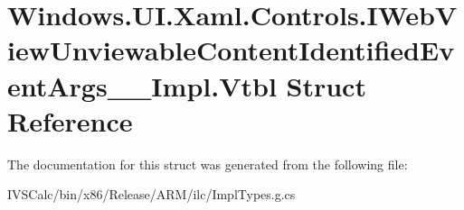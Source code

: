 \hypertarget{struct_windows_1_1_u_i_1_1_xaml_1_1_controls_1_1_i_web_view_unviewable_content_identified_event_args_____impl_1_1_vtbl}{}\section{Windows.\+U\+I.\+Xaml.\+Controls.\+I\+Web\+View\+Unviewable\+Content\+Identified\+Event\+Args\+\_\+\+\_\+\+Impl.\+Vtbl Struct Reference}
\label{struct_windows_1_1_u_i_1_1_xaml_1_1_controls_1_1_i_web_view_unviewable_content_identified_event_args_____impl_1_1_vtbl}


The documentation for this struct was generated from the following file\+:\begin{DoxyCompactItemize}
\item 
I\+V\+S\+Calc/bin/x86/\+Release/\+A\+R\+M/ilc/Impl\+Types.\+g.\+cs\end{DoxyCompactItemize}
